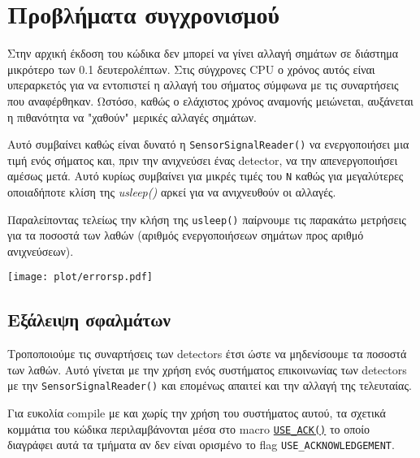\chapter{Προβλήματα συγχρονισμού}

Στην αρχική έκδοση του κώδικα δεν μπορεί να γίνει αλλαγή σημάτων σε διάστημα 
μικρότερο των 0.1 δευτερολέπτων. Στις σύγχρονες CPU ο χρόνος αυτός είναι 
υπεραρκετός για να εντοπιστεί η αλλαγή του σήματος σύμφωνα με τις συναρτήσεις 
που 
αναφέρθηκαν. Ωστόσο, καθώς ο ελάχιστος χρόνος αναμονής μειώνεται, αυξάνεται η 
πιθανότητα να "χαθούν" μερικές αλλαγές σημάτων.

Αυτό συμβαίνει καθώς είναι δυνατό η \lstinline!SensorSignalReader()! να 
ενεργοποιήσει μια τιμή ενός σήματος και, πριν την ανιχνεύσει ένας detector, να 
την απενεργοποιήσει αμέσως μετά. Αυτό κυρίως συμβαίνει για μικρές τιμές του \lstinline!N!
καθώς για μεγαλύτερες οποιαδήποτε κλίση της \textit{usleep()} αρκεί για να 
ανιχνευθούν οι αλλαγές.

Παραλείποντας τελείως την κλήση της \lstinline!usleep()! παίρνουμε τις παρακάτω 
μετρήσεις για τα ποσοστά των λαθών (αριθμός ενεργοποιήσεων σημάτων προς αριθμό 
ανιχνεύσεων).

\begin{center}
\texttt{[image: plot/errorsp.pdf]}
\label{fig:errorsp}
\end{center}

\section{Εξάλειψη σφαλμάτων}

Τροποποιούμε τις συναρτήσεις των detectors έτσι ώστε να μηδενίσουμε τα ποσοστά των λαθών.
 Αυτό γίνεται με την χρήση ενός συστήματος επικοινωνίας των detectors με την 
\lstinline!SensorSignalReader()! και επομένως απαιτεί και την αλλαγή της τελευταίας.

Για ευκολία compile με και χωρίς την χρήση του συστήματος αυτού, τα σχετικά κομμάτια του κώδικα περιλαμβάνονται μέσα στο macro \hyperref[lst:use_ack]{\lstinline!USE_ACK()!} το οποίο διαγράφει αυτά τα τμήματα αν δεν είναι ορισμένο το flag \lstinline!USE_ACKNOWLEDGEMENT!.

